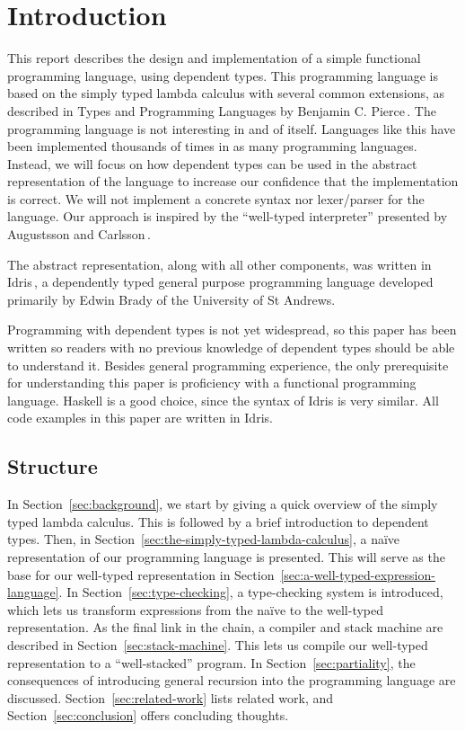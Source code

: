 \section{Introduction}
\label{sec:introduction}

This report describes the design and implementation of a simple functional programming language, using dependent types. This programming language is based on the simply typed lambda calculus with several common extensions, as described in Types and Programming Languages by Benjamin C. Pierce\,\cite{Pierce:TypeSystems}. The programming language is not interesting in and of itself. Languages like this have been implemented thousands of times in as many programming languages. Instead, we will focus on how dependent types can be used in the abstract representation of the language to increase our confidence that the implementation is correct. We will not implement a concrete syntax nor lexer/parser for the language. Our approach is inspired by the ``well-typed interpreter'' presented by Augustsson and Carlsson\,\cite{Augustsson99anexercise}. 

The abstract representation, along with all other components, was written in Idris\,\cite{Idris}, a dependently typed general purpose programming language developed primarily by Edwin Brady of the University of St Andrews.  

Programming with dependent types is not yet widespread, so this paper has been written so readers with no previous knowledge of dependent types should be able to understand it. Besides general programming experience, the only prerequisite for understanding this paper is proficiency with a functional programming language. Haskell is a good choice, since the syntax of Idris is very similar. All code examples in this paper are written in Idris.

\subsection{Structure}
In Section~\ref{sec:background}, we start by giving a quick overview of the simply typed lambda calculus. This is followed by a brief introduction to dependent types. Then, in Section~\ref{sec:the-simply-typed-lambda-calculus}, a na\"{i}ve representation of our programming language is presented. This will serve as the base for our well-typed representation in Section~\ref{sec:a-well-typed-expression-language}. In Section~\ref{sec:type-checking}, a type-checking system is introduced, which lets us transform expressions from the na\"{i}ve to the well-typed representation. As the final link in the chain, a compiler and stack machine are described in Section~\ref{sec:stack-machine}. This lets us compile our well-typed representation to a ``well-stacked'' program. In Section~\ref{sec:partiality}, the consequences of introducing general recursion into the programming language are discussed. Section~\ref{sec:related-work} lists related work, and Section~\ref{sec:conclusion} offers concluding thoughts.
